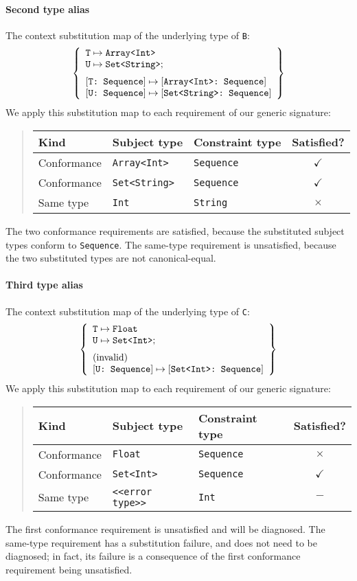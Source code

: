 \documentclass[../generics]{subfiles}
\begin{document}
\begin{example}
\paragraph{Second type alias} The context substitution map of the underlying type of \texttt{B}:
\[
\SubstMapLongC{
\SubstType{T}{Array<Int>}\\
\SubstType{U}{Set<String>}
}{
\SubstConf{T}{Array<Int>}{Sequence}\\
\SubstConf{U}{Set<String>}{Sequence}
}
\]
We apply this substitution map to each requirement of our generic signature:
\begin{quote}
\begin{tabular}{|l|l|l|c|}
\hline
Kind&Subject type&Constraint type&Satisfied?\\
\hline
Conformance&\texttt{Array<Int>}&\texttt{Sequence}&$\checkmark$\\
Conformance&\texttt{Set<String>}&\texttt{Sequence}&$\checkmark$\\
Same type&\texttt{Int}&\texttt{String}&$\times$\\
\hline
\end{tabular}
\end{quote}
The two conformance requirements are satisfied, because the substituted subject types conform to \texttt{Sequence}. The same-type requirement is unsatisfied, because the two substituted types are not canonical-equal.

\paragraph{Third type alias} The context substitution map of the underlying type of \texttt{C}:
\[
\SubstMapLongC{
\SubstType{T}{Float}\\
\SubstType{U}{Set<Int>}
}{
\mbox{(invalid)}\\
\SubstConf{U}{Set<Int>}{Sequence}
}
\]
We apply this substitution map to each requirement of our generic signature:
\begin{quote}
\begin{tabular}{|l|l|l|c|}
\hline
Kind&Subject type&Constraint type&Satisfied?\\
\hline
Conformance&\texttt{Float}&\texttt{Sequence}&$\times$\\
Conformance&\texttt{Set<Int>}&\texttt{Sequence}&$\checkmark$\\
Same type&\texttt{<<error type>>}&\texttt{Int}&$-$\\
\hline
\end{tabular}
\end{quote}
The first conformance requirement is unsatisfied and will be diagnosed. The same-type requirement has a substitution failure, and does not need to be diagnosed; in fact, its failure is a consequence of the first conformance requirement being unsatisfied.
\end{example}
\end{document}
